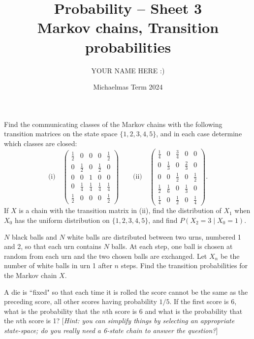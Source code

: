 \documentclass[answers]{exam}
\title{Probability -- Sheet 3\\Markov chains, Transition probabilities}
\author{YOUR NAME HERE :)}
\date{Michaelmas Term 2024}
\begin{document}
\maketitle

\begin{questions}

\question%
Find the communicating classes of the Markov chains with the following transition matrices on the state space $\{1,2,3,4,5\}$, and in each case determine which classes are closed: \[
	\text{(i)}\quad\begin{pmatrix}
		\frac{1}{2} & 0 & 0 & 0 & \frac{1}{2} \\
		0 & \frac{1}{2} & 0 & \frac{1}{2} & 0 \\
		0 & 0 & 1 & 0 & 0 \\
		0 & \frac{1}{4} & \frac{1}{4} & \frac{1}{4} & \frac{1}{4} \\
		\frac{1}{2} & 0 & 0 & 0 & \frac{1}{2}
	\end{pmatrix} \qquad
	\text{(ii)}\quad\begin{pmatrix}
		\frac{1}{4} & 0 & \frac{3}{4} & 0 & 0 \\
		0 & \frac{1}{3} & 0 & \frac{2}{3} & 0 \\
		0 & 0 & \frac{1}{2} & 0 & \frac{1}{2} \\
		\frac{1}{2} & \frac{1}{6} & 0 & \frac{1}{3} & 0 \\
		\frac{1}{4} & 0 & \frac{1}{2} & 0 & \frac{1}{4}
	\end{pmatrix}.
\] If $X$ is a chain with the transition matrix in (ii), find the distribution of $X_{1}$ when $X_{0}$ has the uniform distribution on $\{1,2,3,4,5\}$, and find $P\left(X_{2}=3 \mid X_{0}=1\right)$.



\question%
$N$ black balls and $N$ white balls are distributed between two urns, numbered 1 and 2, so that each urn contains $N$ balls. At each step, one ball is chosen at random from each urn and the two chosen balls are exchanged. Let $X_{n}$ be the number of white balls in urn 1 after $n$ steps. Find the transition probabilities for the Markov chain $X$.



\question%
A die is ``fixed" so that each time it is rolled the score cannot be the same as the preceding score, all other scores having probability $1 / 5$. If the first score is 6, what is the probability that the $n$th score is 6 and what is the probability that the $n$th score is 1? [\emph{Hint: you can simplify things by selecting an appropriate state-space; do you really need a 6-state chain to answer the question?}]




\end{questions}
\end{document}
